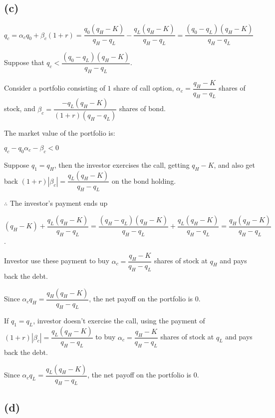 \documentclass{article}
\begin{document}
\subsection*{(c)}

$q_{c}=\alpha_{c}q_{0}+\beta_{c}\left(1+r\right)=\dfrac{q_{0}\left(q_{H}-K\right)}{q_{H}-q_{L}}-\dfrac{q_{L}\left(q_{H}-K\right)}{q_{H}-q_{L}}=\dfrac{\left(q_{0}-q_{L}\right)\left(q_{H}-K\right)}{q_{H}-q_{L}}$

Suppose that $q_{c}<\dfrac{\left(q_{0}-q_{L}\right)\left(q_{H}-K\right)}{q_{H}-q_{L}}$.

Consider a portfolio consisting of $1$ share of call option, $\alpha_{c}=\dfrac{q_{H}-K}{q_{H}-q_{L}}$ shares of stock, and $\beta_{c}=\dfrac{-q_{L}\left(q_{H}-K\right)}{\left(1+r\right)\left(q_{H}-q_{L}\right)}$ shares of bond.

The market value of the portfolio is:

$q_{c}-q_{0}\alpha_{c}-\beta_{c}<0$

Suppose $q_{1}=q_{H}$, then the investor exercises the call, getting $q_{H}-K$, and also get back $\left(1+r\right)|\beta_{c}|=\dfrac{q_{L}\left(q_{H}-K\right)}{q_{H}-q_{L}}$ on the bond holding.

$\therefore$ The investor's payment ends up 

$\left(q_{H}-K\right)+\dfrac{q_{L}\left(q_{H}-K\right)}{q_{H}-q_{L}}=\dfrac{\left(q_{H}-q_{L}\right)\left(q_{H}-K\right)}{q_{H}-q_{L}}+\dfrac{q_{L}\left(q_{H}-K\right)}{q_{H}-q_{L}}=\dfrac{q_{H}\left(q_{H}-K\right)}{q_{H}-q_{L}}$.

Investor use these payment to buy $\alpha_{c}=\dfrac{q_{H}-K}{q_{H}-q_{L}}$ shares of stock at $q_{H}$ and pays back the debt.

Since $\alpha_{c}q_{H}=\dfrac{q_{H}\left(q_{H}-K\right)}{q_{H}-q_{L}}$, the net payoff on the portfolio is $0$.

If $q_{1}=q_{L}$, investor doesn't exercise the call, using the payment of $\left(1+r\right)|\beta_{c}|=\dfrac{q_{L}\left(q_{H}-K\right)}{q_{H}-q_{L}}$ to buy $\alpha_{c}=\dfrac{q_{H}-K}{q_{H}-q_{L}}$ shares of stock at $q_{L}$ and pays back the debt.

Since $\alpha_{c}q_{L}=\dfrac{q_{L}\left(q_{H}-K\right)}{q_{H}-q_{L}}$, the net payoff on the portfolio is $0$.

\subsection*{(d)}
\end{document}
